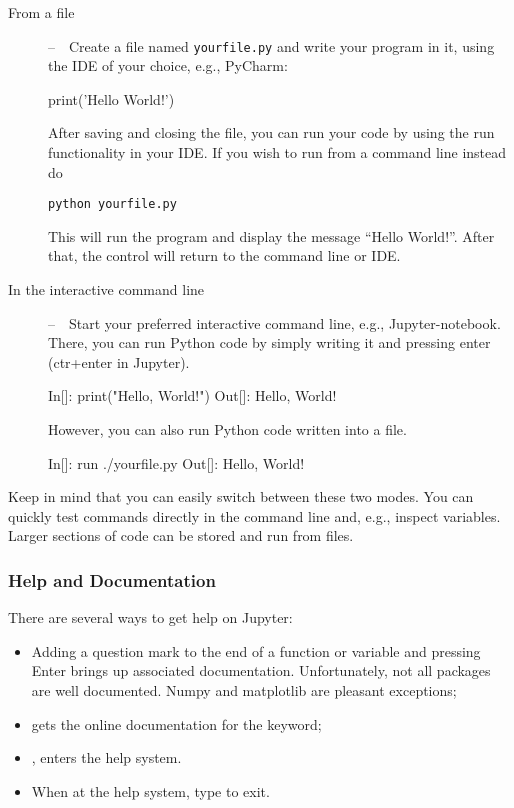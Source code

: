 \begin{description}
\item[From a file]--~~Create a file named \texttt{yourfile.py} and write your 
program in it, using the IDE of your choice, e.g., PyCharm:

\begin{python}
print('Hello World!')
\end{python}

After saving and closing the file, you can run your code by using the run
functionality in your IDE. If you wish to run from a command line instead do

\begin{verbatim}
python yourfile.py
\end{verbatim}

This will run the program and display the message ``Hello World!''. After 
that, the control will return to the command line or IDE.


\item[In the interactive command line]--~~Start your preferred interactive command line, e.g., 
Jupyter-notebook. There, you can run Python code
by simply writing it and pressing enter (ctr+enter in Jupyter).

\begin{python}
 In[]: print("Hello, World!")
Out[]: Hello, World!
\end{python}

However, you can also run Python code written into a file.

\begin{python}
 In[]: run ./yourfile.py
Out[]: Hello, World!
\end{python}
\end{description}

Keep in mind that you can easily switch between these two modes. You can
quickly test commands directly in the command line and, e.g., inspect variables.
Larger sections of code can be stored and run from files.

\subsubsection{Help and Documentation}

There are several ways to get help on Jupyter:

\begin{itemize}
\item Adding a question mark to the end of a function or variable and pressing
Enter brings up associated documentation. Unfortunately, not all packages are
well documented. Numpy and matplotlib are pleasant exceptions;
\item {} gets the online documentation for the  keyword;
\item {}, enters the help system.
\item When at the help system, type  to exit.
\end{itemize}

